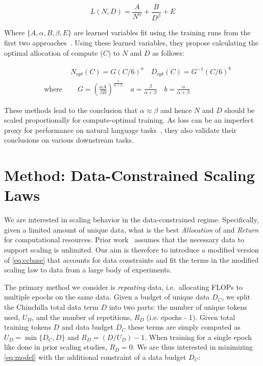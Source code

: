 \documentclass{article}
\begin{document}
\begin{equation}\label{eq:ccbase}
L(N,D) = \frac{A}{N^\alpha} + \frac{B}{D^\beta} + E
\end{equation}

Where $\{A, \alpha, B, \beta, E\}$ are learned variables fit using the training runs from the first two approaches~\cite{hoffmann2022training}. Using these learned variables, they propose calculating the optimal allocation of compute ($C$) to $N$ and $D$ as follows:

\begin{equation}\label{eq:ccopt}
\begin{aligned}
&N_{opt}(C) = G {\left({C}/{6}\right)}^{a}  \quad
D_{opt}(C) = G^{-1} {\left({C}/{6}\right)}^{b}\\
\quad \text{ where } &\quad G = {\left(\frac{\alpha A}{\beta B} \right)}^{\frac{1}{\alpha + \beta}} \quad
a = \frac{\beta}{\alpha+\beta}\quad b = \frac{\alpha}{\alpha + \beta}
\end{aligned}
\end{equation}


These methods lead to the conclusion that $\alpha\approx \beta$ and hence $N$ and $D$ should be scaled proportionally for compute-optimal training. As loss can be an imperfect proxy for performance on natural language tasks~\cite{xia2022training,shin2022effect,tay2021scale}, they also validate their conclusions on various downstream tasks.

\section{Method: Data-Constrained Scaling Laws}
\label{sec:method}

We are interested in scaling behavior in the data-constrained regime. Specifically, given a limited amount of unique data, what is the best \textit{Allocation} of and \textit{Return} for computational resources. Prior work~\cite{kaplan2020scaling,hoffmann2022training} assumes that the necessary data to support scaling is unlimited. Our aim is therefore to introduce a modified version of \autoref{eq:ccbase} that accounts for data constraints and fit the terms in the modified scaling law to data from a large body of experiments.

The primary method we consider is \textit{repeating} data, i.e.\ allocating FLOPs to multiple epochs on the same data. Given a budget of unique data $D_C$, we split the Chinchilla total data term $D$ into two parts: the number of unique tokens used, $U_D$, and the number of repetitions, $R_D$ (i.e. epochs - 1). Given total training tokens $D$ and data budget $D_C$ these terms are simply computed as $U_D = \min \{D_C,D\}$ and $R_D = (D/U_D)-1$. 
When training for a single epoch like done in prior scaling studies, $R_D=0$. We are thus interested in minimizing \autoref{eq:model} with the additional constraint of a data budget $D_C$:
\end{document}
